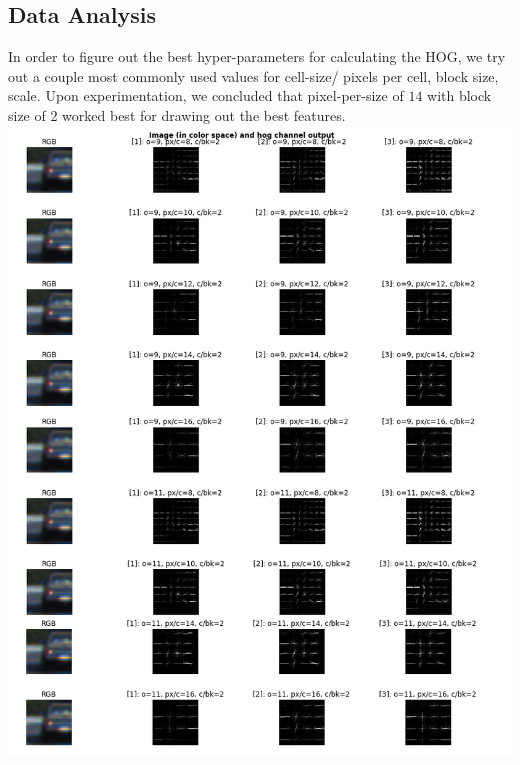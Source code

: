\documentclass{article}
\begin{document}
\subsection{Data Analysis}
In order to figure out the best hyper-parameters for calculating the HOG, we try out a couple most commonly used values for cell-size/ pixels per cell, block size, scale. Upon experimentation, we concluded that pixel-per-size of $14$ with block size of $2$ worked best for drawing out the best features.\\
\includegraphics[width=\textwidth]{1.png}
\end{document}
